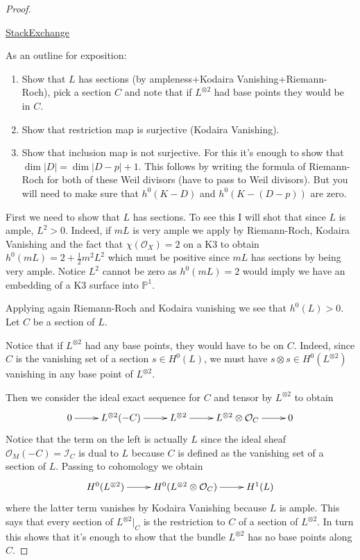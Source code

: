 \begin{proof}
\begin{reference}
\href{https://math.stackexchange.com/questions/5081481/
ample-line-bundle-on-a-k3-surface-implies-l-otimes-2-is-base-point-free/
5081492?noredirect=1#comment10928708_5081492}{StackExchange}
\end{reference}
As an outline for exposition:
\begin{enumerate}
\item Show that $L$ has sections (by ampleness+Kodaira Vanishing+Riemann-Roch), 
pick a section $C$ and note that if 
$L^{\otimes2}$ had base points they would be in $C$.
\item Show that restriction map is surjective (Kodaira Vanishing).
\item Show that inclusion map is not surjective. For this it's enough to show
that $\dim|D|=\dim|D-p|+1$. This follows by writing the formula of Riemann-Roch
for both of these Weil divisors (have to pass to Weil divisors). But you will
need to make sure that $h^0(K-D)$ and $h^0(K-(D-p))$ are zero.
\end{enumerate}

First we need to show that $L$ has sections. To see this I will shot that since
$L$ is ample, $L^2>0$. Indeed, if $mL$ is very ample we apply by Riemann-Roch,
 Kodaira Vanishing and the fact that $\chi(\mathcal{O}_X)=2$ on a K3 to obtain 
$h^0(mL)=2+\frac{1}{2}m^2L^2$ which must be positive since $mL$ has sections by
being very ample. Notice $L^2$ cannot be zero as $h^0(mL)=2$ would imply we have
an embedding of a K3 surface into $\mathbb{P}^1$.

Applying again Riemann-Roch and Kodaira vanishing we see that $h^0(L)>0$. Let
$C$ be a section of $L$.

Notice that if $L^{\otimes 2}$
had any base points, they would have to be on $C$. Indeed, since $C$ is the
vanishing set of a section $s\in H^{0}(L)$, we must have $s \otimes s \in
H^{0}(L^{\otimes 2})$ vanishing in any base point of $L^{\otimes 2}$.

Then we consider the ideal exact sequence for $C$ and tensor by $L^{\otimes 2}$
to obtain
$$
\xymatrix{
0\ar[r]&L^{\otimes 2}(-C)\ar[r]&L^{\otimes 2}\ar[r]&
L^{\otimes 2}\otimes\mathcal{O}_C\ar[r]&0
}
$$
Notice that the term on the left is actually $L$ since the ideal sheaf
$\mathcal{O}_M(-C)=\mathcal{I}_C$ is dual to $L$ because $C$ is defined as the
vanishing set of a section of $L$. Passing to cohomology we obtain
 $$
\xymatrix{
H^{0}(L^{\otimes 2})\ar[r]&H^{0}(L^{\otimes 2}\otimes \mathcal{O}_C)\ar[r]&
H^{1}(L)
}
$$
where the latter term vanishes by Kodaira Vanishing because $L$ is ample.
This says that every section of $L^{\otimes 2}|_C$ is the
restriction to $C$ of a section of $L^{\otimes 2}$. In turn this shows that it's
enough to show that the bundle $L^{\otimes 2}$ has no base points along $C$.


\end{proof}
